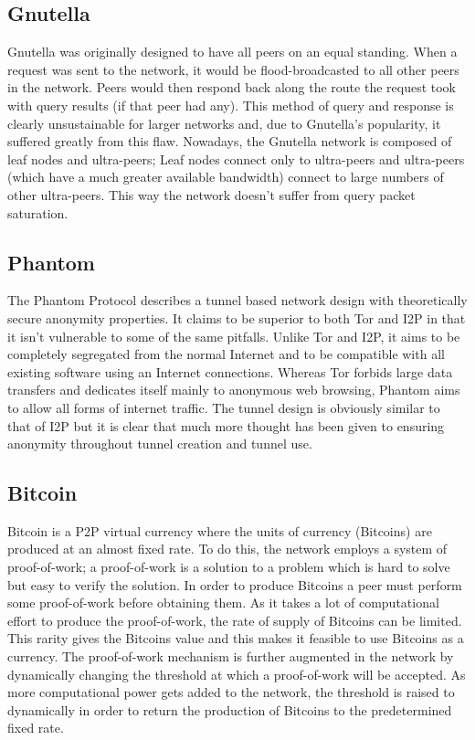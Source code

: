 \documentclass[ %
                    author={Luke Murray},
                supervisor={Dr. Simon Hollis},
                     title={Shadow Peer-to-Peer Networks},
                  subtitle={},
                    degree={MEng},
                      year={2013} ]{thesis}
\begin{document}
\subsection{Gnutella}

Gnutella\cite{Gnutella} was originally designed to have all peers on an equal standing. When a request was sent to the network, it would be flood-broadcasted to all other peers in the network. Peers would then respond back along the route the request took with query results (if that peer had any). This method of query and response is clearly unsustainable for larger networks and, due to Gnutella's popularity, it suffered greatly from this flaw. Nowadays, the Gnutella network is composed of leaf nodes and ultra-peers; Leaf nodes connect only to ultra-peers and ultra-peers (which have a much greater available bandwidth) connect to large numbers of other ultra-peers. This way the network doesn't suffer from query packet saturation.

\subsection{Phantom}

The Phantom Protocol\cite{Phantom} describes a tunnel based network design with theoretically secure anonymity properties. It claims to be superior to both Tor and I2P in that it isn't vulnerable to some of the same pitfalls. Unlike Tor and I2P, it aims to be completely segregated from the normal Internet and to be compatible with all existing software using an Internet connections. Whereas Tor forbids large data transfers and dedicates itself mainly to anonymous web browsing, Phantom aims to allow all forms of internet traffic. The tunnel design is obviously similar to that of I2P but it is clear that much more thought has been given to ensuring anonymity throughout tunnel creation and tunnel use.

\subsection{Bitcoin}

Bitcoin\cite{Bitcoin} is a P2P virtual currency where the units of currency (Bitcoins) are produced at an almost fixed rate. To do this, the network employs a system of proof-of-work; a proof-of-work is a solution to a problem which is hard to solve but easy to verify the solution. In order to produce Bitcoins a peer must perform some proof-of-work before obtaining them. As it takes a lot of computational effort to produce the proof-of-work, the rate of supply of Bitcoins can be limited. This rarity gives the Bitcoins value and this makes it feasible to use Bitcoins as a currency. The proof-of-work mechanism is further augmented in the network by dynamically changing the threshold at which a proof-of-work will be accepted. As more computational power gets added to the network, the threshold is raised to dynamically in order to return the production of Bitcoins to the predetermined fixed rate.
\end{document}
